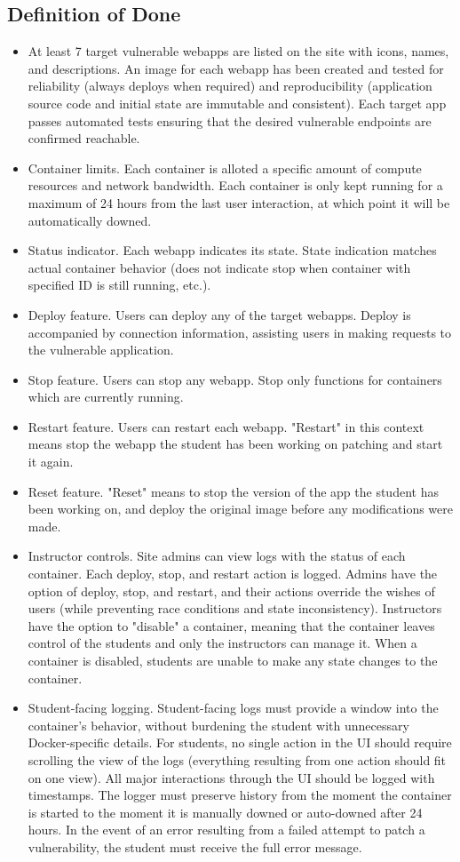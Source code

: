 \documentclass[12pt]{article}
\begin{document}
\subsection{Definition of Done}
\begin{itemize}
	\item At least 7 target vulnerable webapps are listed on the site with icons, names, and descriptions. An image for each webapp has been created and tested for reliability (always deploys when required) and reproducibility (application source code and initial state are immutable and consistent). Each target app passes automated tests ensuring that the desired vulnerable endpoints are confirmed reachable.
	\item Container limits. Each container is alloted a specific amount of compute resources and network bandwidth. Each container is only kept running for a maximum of 24 hours from the last user interaction, at which point it will be automatically downed.
	\item Status indicator. Each webapp indicates its state. State indication matches actual container behavior (does not indicate stop when container with specified ID is still running, etc.).
	\item Deploy feature. Users can deploy any of the target webapps. Deploy is accompanied by connection information, assisting users in making requests to the vulnerable application.
	\item Stop feature. Users can stop any webapp. Stop only functions for containers which are currently running.
	\item Restart feature. Users can restart each webapp. "Restart" in this context means stop the webapp the student has been working on patching and start it again.
	\item Reset feature. "Reset" means to stop the version of the app the student has been working on, and deploy the original image before any modifications were made.
	\item Instructor controls. Site admins can view logs with the status of each container. Each deploy, stop, and restart action is logged. Admins have the option of deploy, stop, and restart, and their actions override the wishes of users (while preventing race conditions and state inconsistency). Instructors have the option to "disable" a container, meaning that the container leaves control of the students and only the instructors can manage it. When a container is disabled, students are unable to make any state changes to the container.
	\item Student-facing logging. Student-facing logs must provide a window into the container's behavior, without burdening the student with unnecessary Docker-specific details. For students, no single action in the UI should require scrolling the view of the logs (everything resulting from one action should fit on one view). All major interactions through the UI should be logged with timestamps. The logger must preserve history from the moment the container is started to the moment it is manually downed or auto-downed after 24 hours. In the event of an error resulting from a failed attempt to patch a vulnerability, the student must receive the full error message.

\end{itemize}
\end{document}
